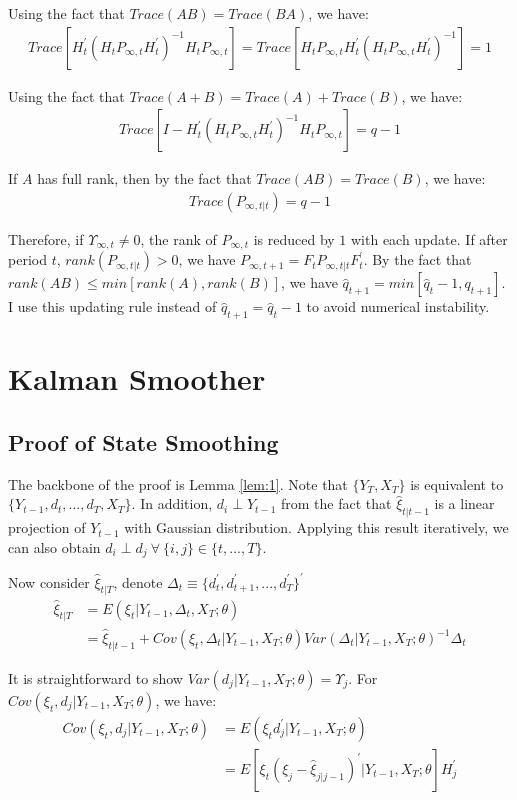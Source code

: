 \documentclass[10pt, titlepage]{article}
\numberwithin{equation}{section}
\begin{document}
Using the fact that $Trace(AB)=Trace(BA)$, we have:
\begin{align*}
    Trace[H_t^{'}(H_tP_{\infty,t}H_t^{'})^{-1}H_tP_{\infty,t}] = Trace[H_tP_{\infty,t}H_t^{'}(H_tP_{\infty,t}H_t^{'})^{-1}] = 1
\end{align*}

Using the fact that $Trace(A+B) = Trace(A) + Trace(B)$, we have:
\begin{align*}
    Trace[I - H_t^{'}(H_tP_{\infty,t}H_t^{'})^{-1}H_tP_{\infty,t}]=q-1
\end{align*}

If $A$ has full rank, then by the fact that $Trace(AB)=Trace(B)$, we have:
\begin{align*}
    Trace(P_{\infty,t|t}) = q-1
\end{align*}

Therefore, if $\Upsilon_{\infty,t}\neq0$, the rank of $P_{\infty,t}$ is reduced by $1$ with each update. If after period $t$, $rank(P_{\infty,t|t})>0$, we have $P_{\infty,t+1} = F_tP_{\infty,t|t}F_t^{'}$. By the fact that $rank(AB)\leq min[rank(A), rank(B)]$, we have $\hat{q}_{t+1}=min[\hat{q}_t-1,q_{t+1}]$. I use this updating rule instead of $\hat{q}_{t+1} = \hat{q}_t-1$ to avoid numerical instability. 

\section{Kalman Smoother}
\subsection{Proof of State Smoothing} \label{ap:smooth}
The backbone of the proof is Lemma \ref{lem:1}. Note that $\{Y_T, X_T\}$ is equivalent to $\{Y_{t-1},d_t,...,d_T, X_T\}$. In addition, $d_i \perp Y_{t-1}$ from the fact that $\hat{\xi}_{t|t-1}$ is a linear projection of $Y_{t-1}$ with Gaussian distribution. Applying this result iteratively, we can also obtain $d_i \perp d_j \:\forall\: \{i,j\} \in \{t,...,T\}$.

Now consider $\hat{\xi}_{t|T}$, denote $\Delta_t\equiv\{d_t^{'},d_{t+1}^{'},...,d_T^{'}\}^{'}$ 
\begin{align*}
    \hat{\xi}_{t|T} &= E(\xi_t|Y_{t-1},\Delta_{t},X_T;\theta) \\
    &= \hat{\xi}_{t|t-1} + Cov(\xi_t,\Delta_t|Y_{t-1},X_T;\theta)Var(\Delta_t|Y_{t-1},X_T;\theta)^{-1}\Delta_t
\end{align*}

It is straightforward to show $Var(d_j|Y_{t-1},X_T;\theta)=\Upsilon_j$. For $Cov(\xi_t,d_j|Y_{t-1},X_T;\theta)$, we have:
\begin{align*}
    Cov(\xi_t,d_j|Y_{t-1},X_T;\theta) &= E(\xi_td_j^{'}|Y_{t-1},X_T;\theta) \\
    &= E[\xi_t(\xi_j-\hat{\xi}_{j|j-1})^{'}|Y_{t-1},X_T;\theta]H_j^{'} 
\end{align*}
\end{document}
